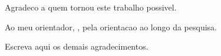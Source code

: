 %

\begin{agradecimentos}
  Agradeco a quem tornou este trabalho possivel.

  Ao meu orientador, \lkAdvisor, pela orientacao ao longo da pesquisa.

  Escreva aqui os demais agradecimentos.
\end{agradecimentos}
